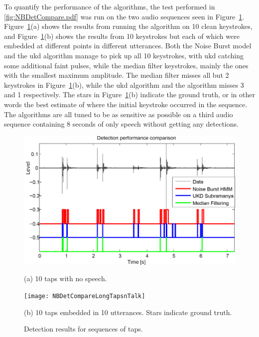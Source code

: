 To quantify the performance of the algorithms, the test performed in \ref{fig:NBDetCompare.pdf} was run on the two audio sequences seen in Figure~\ref{fig:NBDetectionResults}. Figure~\ref{fig:NBDetectionResults}(a) shows the results from running the algorithm on 10 clean keystrokes, and Figure~\ref{fig:NBDetectionResults}(b) shows the results from 10 keystrokes but each of which were embedded at different points in different utterances. Both the Noise Burst model and the \DIFdelbegin {}\DIFdelend \DIFaddbegin \gls{ukd} \DIFaddend algorithm manage to pick up all 10 keystrokes, with \DIFdelbegin {}\DIFdelend \DIFaddbegin \gls{ukd} \DIFaddend catching some additional faint pulses, while the median filter \DIFdelbegin {}\DIFdelend \DIFaddbegin {} keystrokes, mainly the ones with the smallest maximum amplitude. The median filter misses all but 2 keystrokes in Figure~\ref{fig:NBDetectionResults}(b), while the \DIFdelbegin {}\DIFdelend \DIFaddbegin \gls{ukd} \DIFaddend algorithm and the \DIFdelbegin {}\DIFdelend \DIFaddbegin {}\DIFaddend algorithm misses 3 and 1 respectively. The stars in Figure~\ref{fig:NBDetectionResults}(b) indicate the ground truth, or in other words the best estimate of where the initial keystroke occurred in the sequence. The algorithms are all tuned to be as sensitive as possible on a third audio sequence containing 8 seconds of only speech without getting any detections.

\begin{figure}
\begin{minipage}[b]{1.0\linewidth}
  \centering
  \centerline{\includegraphics[width=12.5cm]{NBDetCompareLongTaps}}
  \centerline{(a) 10 taps with no speech.}\medskip
\end{minipage}
%
\begin{minipage}[b]{1.0\linewidth}
  \centering
  \centerline{\texttt{[image: NBDetCompareLongTapsnTalk]}}
  \centerline{(b) 10 taps embedded in 10 utterances. Stars indicate ground truth.}\medskip
\end{minipage}
\hfill
%
\caption{Detection results for sequences of taps.}
\label{fig:NBDetectionResults}
\end{figure}


